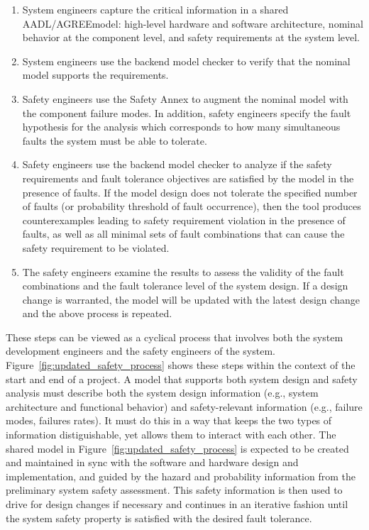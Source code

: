 \begin{enumerate}
	\item System engineers capture the critical information in a shared AADL/AGREEmodel:  high-level hardware and software architecture, nominal behavior at the component level, and safety requirements at the system level.%
	\item System engineers use the backend model checker to verify that the nominal model supports the requirements.
	\item Safety engineers use the Safety Annex to augment the nominal model with the component failure modes. %
	In addition, safety engineers specify the fault hypothesis for the analysis which corresponds to how many simultaneous faults the system must be able to tolerate.
	\item Safety engineers use the backend model checker to analyze if the safety requirements and fault tolerance objectives are satisfied by the model in the presence of faults. %
	If the model design does not tolerate the specified number of faults (or probability threshold of fault occurrence), then the tool produces counterexamples leading to safety requirement violation in the presence of faults, %
	 as well as all minimal sets of fault combinations that can cause the safety requirement to be violated.
	\item The safety engineers examine the results to assess the validity of the fault combinations and the fault tolerance level of the system design. If a design change is warranted, the model will be updated with the latest design change and the above process is repeated.
\end{enumerate}

These steps can be viewed as a cyclical process that involves both the system development engineers and the safety engineers of the system. Figure~\ref{fig:updated_safety_process} shows these steps within the context of the start and end of a project. A model that supports both system design and safety analysis must describe both the system design information (e.g., system architecture and functional behavior) and safety-relevant information (e.g., failure modes, failures rates). It must do this in a way that keeps the two types of information distiguishable, yet allows them to interact with each other. The shared model in Figure~\ref{fig:updated_safety_process} is expected to be created and maintained in sync with the software and hardware design and implementation, and guided by the hazard and probability information from the preliminary system safety assessment. This safety information is then used to drive for design changes if necessary and continues in an iterative fashion until the system safety property is satisfied with the desired fault tolerance. 